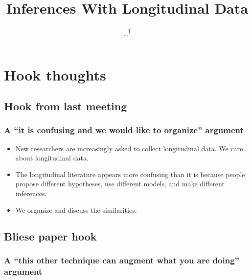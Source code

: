 \documentclass[english,,man]{apa6}
\title{Inferences With Longitudinal Data}
\author{\ldots{}\textsuperscript{1}}
\date{}
\affiliation{
\vspace{0.5cm}
\textsuperscript{1} ...}
\providecommand{\tightlist}{%
  \setlength{\itemsep}{0pt}\setlength{\parskip}{0pt}}
\theoremstyle{definition}
\theoremstyle{definition}
\theoremstyle{definition}
\theoremstyle{remark}
\begin{document}
\maketitle

\hypertarget{hook-thoughts}{%
\section{Hook thoughts}\label{hook-thoughts}}

\hypertarget{hook-from-last-meeting}{%
\subsection{Hook from last meeting}\label{hook-from-last-meeting}}

\hypertarget{a-it-is-confusing-and-we-would-like-to-organize-argument}{%
\subsubsection{\texorpdfstring{A \enquote{it is confusing and we would
like to organize}
argument}{A ``it is confusing and we would like to organize'' argument}}\label{a-it-is-confusing-and-we-would-like-to-organize-argument}}

\begin{itemize}
\tightlist
\item
  New researchers are increasingly asked to collect longitudinal data.
  We care about longitudinal data.
\item
  The longitudinal literature appears more confusing than it is because
  people propose different hypotheses, use different models, and make
  different inferences.
\item
  We organize and discuss the similarities.
\end{itemize}

\hypertarget{bliese-paper-hook}{%
\subsection{Bliese paper hook}\label{bliese-paper-hook}}

\hypertarget{a-this-other-technique-can-augment-what-you-are-doing-argument}{%
\subsubsection{\texorpdfstring{A \enquote{this other technique can
augment what you are doing}
argument}{A ``this other technique can augment what you are doing'' argument}}\label{a-this-other-technique-can-augment-what-you-are-doing-argument}}
\end{document}
